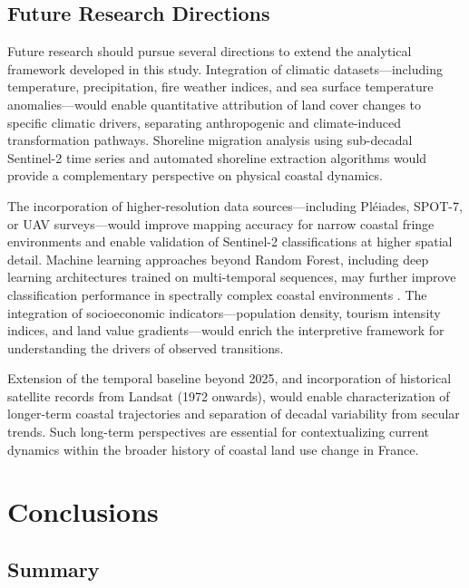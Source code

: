 \documentclass[coasts,article,submit,pdftex,moreauthors]{Definitions/mdpi}
\begin{document}
\subsection{Future Research Directions}

Future research should pursue several directions to extend the analytical framework developed in this study. Integration of climatic datasets—including temperature, precipitation, fire weather indices, and sea surface temperature anomalies—would enable quantitative attribution of land cover changes to specific climatic drivers, separating anthropogenic and climate-induced transformation pathways. Shoreline migration analysis using sub-decadal Sentinel-2 time series and automated shoreline extraction algorithms would provide a complementary perspective on physical coastal dynamics.

The incorporation of higher-resolution data sources—including Pléiades, SPOT-7, or UAV surveys—would improve mapping accuracy for narrow coastal fringe environments and enable validation of Sentinel-2 classifications at higher spatial detail. Machine learning approaches beyond Random Forest, including deep learning architectures trained on multi-temporal sequences, may further improve classification performance in spectrally complex coastal environments \citep{w16081141}. The integration of socioeconomic indicators—population density, tourism intensity indices, and land value gradients—would enrich the interpretive framework for understanding the drivers of observed transitions.

Extension of the temporal baseline beyond 2025, and incorporation of historical satellite records from Landsat (1972 onwards), would enable characterization of longer-term coastal trajectories and separation of decadal variability from secular trends. Such long-term perspectives are essential for contextualizing current dynamics within the broader history of coastal land use change in France.

\section{Conclusions}

\subsection{Summary}
\end{document}
